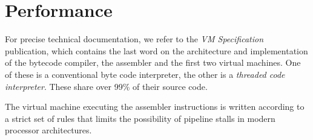 \section{Performance}

For precise technical documentation, we refer to the \emph{\crexx{} VM Specification} publication, which contains the last word on the architecture and implementation of the bytecode compiler, the assembler and the first two virtual machines. One of these is a conventional byte code interpreter, the other is a \emph{threaded code interpreter}. These share over 99\% of their source code.

The virtual machine executing the \rexx assembler instructions is written according to a strict set of rules that limits the possibility of pipeline stalls in modern processor architectures.